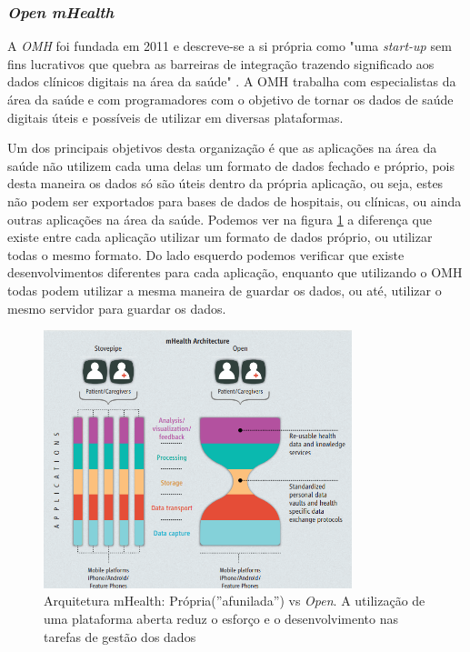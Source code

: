 \subsubsection{\textit{Open mHealth}}
A \textit{\gls{OMH}} foi fundada em 2011 e descreve-se a si própria como "uma \textit{start-up} sem fins lucrativos que quebra as barreiras de integração trazendo significado aos dados clínicos digitais na área da saúde" \cite{omhabout}. A \gls{OMH} trabalha com especialistas da área da saúde e com programadores com o objetivo de tornar os dados de saúde digitais úteis e possíveis de utilizar em diversas plataformas. \par 
Um dos principais objetivos desta organização é que as aplicações na área da saúde não utilizem cada uma delas um formato de dados fechado e próprio, pois desta maneira os dados só são úteis dentro da própria aplicação, ou seja, estes não podem ser exportados para bases de dados de hospitais, ou clínicas, ou ainda outras aplicações na área da saúde. Podemos ver na figura \ref{f:omharch} a diferença que existe entre cada aplicação utilizar um formato de dados próprio, ou utilizar todas o mesmo formato\cite{omharticle}. Do lado esquerdo podemos verificar que existe desenvolvimentos diferentes para cada aplicação, enquanto que utilizando o \gls{OMH} todas podem utilizar a mesma maneira de guardar os dados, ou até, utilizar o mesmo servidor para guardar os dados.
\begin{figure}[H]
  \centering
  \includegraphics[width=0.8\textwidth]{imgs/openmharch.png}
  \caption[Arquitetura mHealth: Própria vs \textit{Open}]{Arquitetura mHealth: Própria(''afunilada'') vs \textit{Open}. \cite{omharticle} A utilização de uma plataforma aberta reduz o esforço e o desenvolvimento nas tarefas de gestão dos dados}
  
  \label{f:omharch}
\end{figure}


